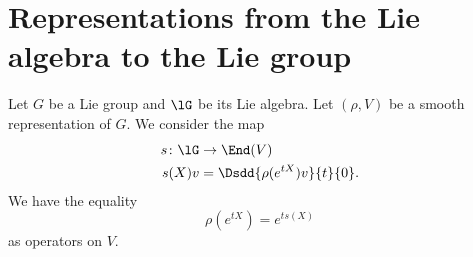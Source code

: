 
\section{Representations from the Lie algebra to the Lie group}

\begin{proposition}       \label{PROPooXCGMooKlJlwp}
	Let \( G\) be a Lie group and \( \lG\) be its Lie algebra. Let \( (\rho, V)\) be a smooth representation of \( G\). We consider the map
	\begin{equation}
		\begin{aligned}
			s\colon \lG & \to \End(V)                     \\
			s(X)v       & =\Dsdd{ \rho( e^{tX})v }{t}{0}.
		\end{aligned}
	\end{equation}
	We have the equality
	\begin{equation}
		\rho( e^{tX})= e^{ts(X)}
	\end{equation}
	as operators on \( V\).
\end{proposition}


